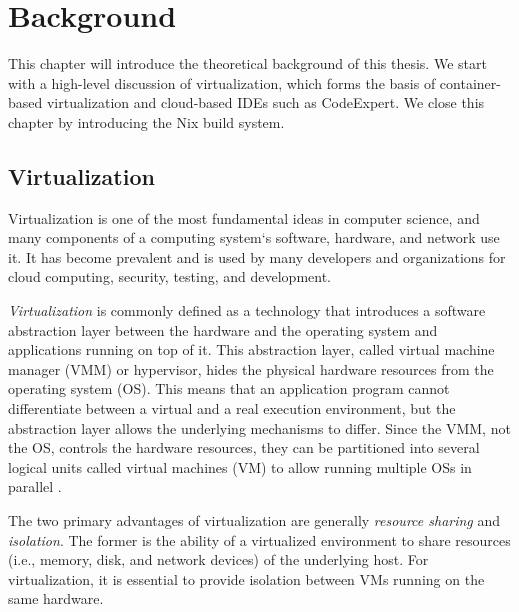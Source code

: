\chapter{Background}\label{background-chapter}
This chapter will introduce the theoretical background of this thesis. We start with a high-level discussion of virtualization, which forms the basis of container-based virtualization and cloud-based IDEs such as CodeExpert. We close this chapter by introducing the Nix build system.

\section{Virtualization}
Virtualization is one of the most fundamental ideas in computer science, and many components of a computing system`s software, hardware, and network use it. It has become prevalent and is used by many developers and organizations for cloud computing, security, testing, and development.

\emph{Virtualization} is commonly defined as a technology that introduces a software abstraction layer between the hardware and the operating system and applications running on top of it. This abstraction layer, called virtual machine manager (VMM) or hypervisor, hides the physical hardware resources from the operating system (OS). This means that an application program cannot differentiate between a virtual and a real execution environment, but the abstraction layer allows the underlying mechanisms to differ. Since the VMM, not the OS, controls the hardware resources, they can be partitioned into several logical units called virtual machines (VM) to allow running multiple OSs in parallel \cite{Sahoo2010}.  

The two primary advantages of virtualization are generally \emph{resource sharing} and \emph{isolation}. The former is the ability of a virtualized environment to share resources (i.e., memory, disk, and network devices) of the underlying host. For virtualization, it is essential to provide isolation between VMs running on the same hardware.


